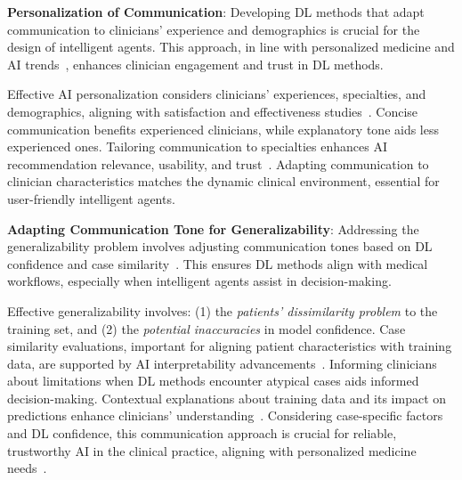 \vspace{2.00mm}

\noindent
\textcolor{revised}{{\bf Personalization of Communication}:
Developing \ac{DL} methods that adapt communication to clinicians' experience and demographics is crucial for the design of intelligent agents.
This approach, in line with personalized medicine and \ac{AI} trends~\cite{jpm10040211}, enhances clinician engagement and trust in \ac{DL} methods.}

\vspace{2.00mm}

\textcolor{revised}{Effective \ac{AI} personalization considers clinicians' experiences, specialties, and demographics, aligning with satisfaction and effectiveness studies~\cite{LIN2021e486}.
Concise communication benefits experienced clinicians, while explanatory tone aids less experienced ones.
Tailoring communication to specialties enhances \ac{AI} recommendation relevance, usability, and trust~\cite{EVANS2022281}.
Adapting communication to clinician characteristics matches the dynamic clinical environment, essential for user-friendly intelligent agents.}


\noindent
\textcolor{revised}{{\bf Adapting Communication Tone for Generalizability}:
Addressing the generalizability problem involves adjusting communication tones based on \ac{DL} confidence and case similarity~\cite{10.1145/3290605.3300234}.
This ensures \ac{DL} methods align with medical workflows, especially when intelligent agents assist in decision-making.}

\vspace{2.00mm}

\textcolor{revised}{Effective generalizability involves:
(1) the {\it patients' dissimilarity problem} to the training set, and
(2) the {\it potential inaccuracies} in model confidence.
Case similarity evaluations, important for aligning patient characteristics with training data, are supported by \ac{AI} interpretability advancements~\cite{10.1145/3544548.3581075}.
Informing clinicians about limitations when \ac{DL} methods encounter atypical cases aids informed decision-making.
Contextual explanations about training data and its impact on predictions enhance clinicians' understanding~\cite{10.1145/3290605.3300468}.
Considering case-specific factors and \ac{DL} confidence, this communication approach is crucial for reliable, trustworthy \ac{AI} in the clinical practice, aligning with personalized medicine needs~\cite{LIN2021e486}.}

